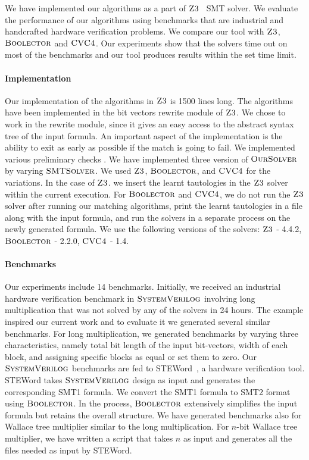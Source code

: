 

We have implemented our algorithms as a part of $\textsc{Z3}$~\cite{z3} SMT solver.
%
 We evaluate the performance of our algorithms using benchmarks that are industrial and handcrafted hardware verification problems.
%
We compare our tool with $\textsc{Z3}$, $\textsc{Boolector}$\cite{boolector} and $\textsc{CVC4}$\cite{cvc4}.
%
Our experiments show that the solvers time out on most of the benchmarks and our tool produces results within the set time limit.

\paragraph{\bf Implementation}
Our implementation of the algorithms in $\textsc{Z3}$ is 1500 lines long.
%
The algorithms have been implemented in the bit vectors rewrite module of $\textsc{Z3}$.
%
We chose to work in the rewrite module, since it gives an easy access to the abstract syntax tree of the input formula.
%
An important aspect of the implementation is the ability to exit as early as possible if the match is going to fail.
%
We implemented various preliminary checks .
%
We have implemented three version of $\textsc{OurSolver}$ by varying
$\textsc{SMTSolver}$.
%
We used  $\textsc{Z3}$, $\textsc{Boolector}$, and $\textsc{CVC4}$ for the variations. 
%
In the case of $\textsc{Z3}$.
we insert the learnt tautologies in the $\textsc{Z3}$ solver within the current execution.
%
For $\textsc{Boolector}$ and $\textsc{CVC4}$,
we do not run the $\textsc{Z3}$ solver after running our matching algorithms,
print the learnt tautologies in a file along with the input formula, and
run the solvers in a separate process on the newly generated formula. We use the following versions of the solvers: $\textsc{Z3}$ - 4.4.2, $\textsc{Boolector}$ - 2.2.0, $\textsc{CVC4}$ - 1.4.

\paragraph{\bf Benchmarks}
%
Our experiments include 14 benchmarks.
%
Initially, we received an industrial hardware verification benchmark in $\textsc{SystemVerilog}$ involving long multiplication that was not solved by any of the solvers in 24 hours.
%
The example inspired our current work and to evaluate it we generated several similar benchmarks.
%
For long multiplication, we generated benchmarks by varying three characteristics, namely total bit length of the input bit-vectors, width of each block, and assigning specific blocks as equal or set them to zero.
%
Our $\textsc{SystemVerilog}$ benchmarks are fed to STEWord~\cite{Word-level-Symbolic-Trajectory-Evaluation}, a hardware verification tool.
%
STEWord takes $\textsc{SystemVerilog}$ design as input and generates the corresponding SMT1 formula.
%
We convert the SMT1 formula to SMT2 format using $\textsc{Boolector}$.
%
In the process, $\textsc{Boolector}$ extensively simplifies the input formula but retains the overall structure.
%
We have generated benchmarks also for Wallace tree multiplier similar to the long multiplication.
%
For $n$-bit Wallace tree multiplier, we have written a script that takes $n$ as input and generates all the files needed as input by STEWord.
%


